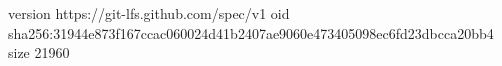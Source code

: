 version https://git-lfs.github.com/spec/v1
oid sha256:31944e873f167ccac060024d41b2407ae9060e473405098ec6fd23dbcca20bb4
size 21960
